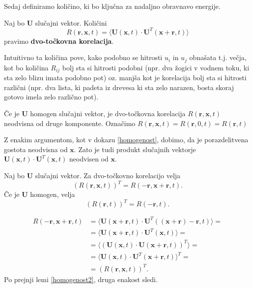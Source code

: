 \documentclass[mat2, tisk]{fmfdelo}
\newcommand{\bd}{\textbf}
\begin{document}
Sedaj definiramo količino, ki bo ključna za nadaljno obravnavo 
energije.

\begin{definicija}
Naj bo $\bd{U}$ slučajni vektor. Količini 
\begin{equation}
R(\bd{r}, \bd{x}, t) = \langle \bd{U}(\bd{x}, t)\cdot \bd{U}^T(\bd{x} + \bd{r}, t)\rangle
\end{equation}
pravimo \textbf{dvo-točkovna korelacija}.
\end{definicija}

Intuitivno ta količina pove, kako podobno se hitrosti $u_i$ in 
$u_j$ obnašata t.j. večja, kot bo količina $R_{ij}$ bolj sta si hitrosti 
podobni (npr. dva žogici v vodnem toku, ki sta zelo blizu imata podobno pot) oz. 
manjša kot je korelacija bolj sta si hitrosti različni (npr. dva lista, ki padeta 
iz drevesa ki sta zelo narazen, bosta skoraj gotovo imela zelo različno pot).

\begin{lema}
\label{homogenost2}
Če je $\bd{U}$ homogen slučajni vektor, je
dvo-točkovna korelacija $R(\bd{r}, \bd{x}, t)$ neodvisna od druge komponente.
Označimo $R(\bd{r}, \bd{x}, t) = R(\bd{r}, 0, t) = R(\bd{r}, t)$
\end{lema}

\begin{dokaz}
Z enakim argumentom, kot v dokazu \ref{homogenost}, dobimo, da je 
porazdelitvena gostota neodvisna od $\bd{x}$. Zato je tudi produkt 
slučajnih vektorje $\bd{U}(\bd{x}, t)\cdot \bd{U}^T(\bd{x}, t)$ neodvisen 
od $\bd{x}$.
\end{dokaz}

\begin{lema}
\label{dvo_točkovna_korelacija}
Naj bo $\bd{U}$ slučajni vektor. Za dvo-točkovno korelacijo velja 
\begin{equation}
(R(\bd{r}, \bd{x}, t))^T = R(-\bd{r}, \bd{x} + \bd{r}, t). 
\end{equation}
Če je $\bd{U}$ homogen, velja 
\begin{equation}
(R(\bd{r}, t))^T = R(-\bd{r}, t). 
\end{equation}
\end{lema}

\begin{dokaz}
\begin{align*}
  R(-\bd{r}, \bd{x} + \bd{r}, t) &= \langle \bd{U}(\bd{x} + \bd{r}, t)\cdot \bd{U}^T((\bd{x} + \bd{r}) - \bd{r}, t)\rangle = \\
  &= \langle \bd{U}(\bd{x} + \bd{r}, t)\cdot \bd{U}^T(\bd{x}, t)\rangle = \\
  &= \langle(\bd{U}(\bd{x}, t)\cdot \bd{U}(\bd{x} + \bd{r}, t))^T\rangle =\\
  &= \langle \bd{U}(\bd{x}, t)\cdot \bd{U}^T(\bd{x} + \bd{r}, t)\rangle^T =\\
  &= (R(\bd{r}, \bd{x}, t))^T.
\end{align*}  
Po prejnji lemi \ref{homogenost2}, druga enakost sledi.
\end{dokaz}
\end{document}
